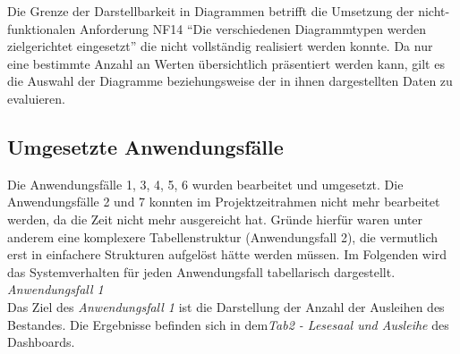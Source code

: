 Die Grenze der Darstellbarkeit in Diagrammen betrifft die Umsetzung der nicht-funktionalen Anforderung NF14 \enquote{Die verschiedenen Diagrammtypen werden zielgerichtet eingesetzt}
die nicht vollständig realisiert werden konnte. Da nur eine bestimmte Anzahl an Werten übersichtlich präsentiert werden kann, gilt es die Auswahl der Diagramme
beziehungsweise der in ihnen dargestellten Daten zu evaluieren. 



\subsection{Umgesetzte Anwendungsfälle}
Die Anwendungsfälle 1, 3, 4, 5, 6 wurden bearbeitet und umgesetzt.
Die Anwendungsfälle 2 und 7 konnten im Projektzeitrahmen nicht mehr bearbeitet werden, 
da die Zeit nicht mehr ausgereicht hat. Gründe hierfür waren unter anderem eine komplexere Tabellenstruktur (Anwendungsfall 2),
die vermutlich erst in einfachere Strukturen aufgelöst hätte werden müssen. Im Folgenden wird das Systemverhalten für jeden
Anwendungsfall tabellarisch dargestellt.\\

\clearpage
\noindent
\textit{Anwendungsfall 1}\\
Das Ziel des \textit{Anwendungsfall 1} ist die Darstellung der Anzahl der Ausleihen des Bestandes.
Die Ergebnisse befinden sich in dem\textit{Tab2 - Lesesaal und Ausleihe} des Dashboards.

